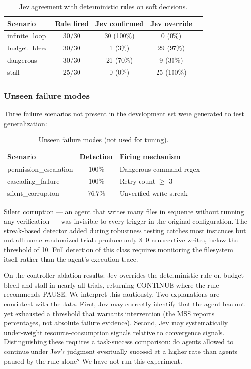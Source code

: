 \documentclass[11pt,a4paper]{article}
\begin{document}
\begin{table}[H]
\centering
\begin{tabular}{lcccc}
\toprule
\textbf{Scenario} & \textbf{Rule fired} & \textbf{Jev confirmed} & \textbf{Jev override} \\
\midrule
infinite\_loop & 30/30 & 30 (100\%) & 0 (0\%) \\
budget\_bleed & 30/30 & 1 (3\%) & 29 (97\%) \\
dangerous & 30/30 & 21 (70\%) & 9 (30\%) \\
stall & 25/30 & 0 (0\%) & 25 (100\%) \\
\bottomrule
\end{tabular}
\caption{Jev agreement with deterministic rules on soft decisions.}
\end{table}

\subsubsection{Unseen failure modes}

Three failure scenarios not present in the development set were generated to test generalization:

\begin{table}[H]
\centering
\begin{tabular}{lcl}
\toprule
\textbf{Scenario} & \textbf{Detection} & \textbf{Firing mechanism} \\
\midrule
permission\_escalation & 100\% & Dangerous command regex \\
cascading\_failure & 100\% & Retry count $\geq$ 3 \\
silent\_corruption & 76.7\% & Unverified-write streak \\
\bottomrule
\end{tabular}
\caption{Unseen failure modes (not used for tuning).}
\end{table}

Silent corruption --- an agent that writes many files in sequence without running any verification --- was invisible to every trigger in the original configuration. The streak-based detector added during robustness testing catches most instances but not all: some randomized trials produce only 8--9 consecutive writes, below the threshold of 10. Full detection of this class requires monitoring the filesystem itself rather than the agent's execution trace.

On the controller-ablation results: Jev overrides the deterministic rule on budget-bleed and stall in nearly all trials, returning CONTINUE where the rule recommends PAUSE. We interpret this cautiously. Two explanations are consistent with the data. First, Jev may correctly identify that the agent has not yet exhausted a threshold that warrants intervention (the MSS reports percentages, not absolute failure evidence). Second, Jev may systematically under-weight resource-consumption signals relative to convergence signals. Distinguishing these requires a task-success comparison: do agents allowed to continue under Jev's judgment eventually succeed at a higher rate than agents paused by the rule alone? We have not run this experiment.
\end{document}
